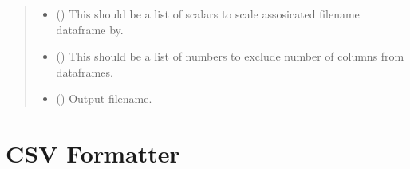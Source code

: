 \documentclass[letterpaper,10pt,english,openany,oneside]{sphinxmanual}
\begin{document}
\begin{fulllineitems}
\begin{quote}
\begin{description}
\begin{itemize}
\item {} 
 (\sphinxstyleliteralemphasis{\sphinxupquote{{[}}}\sphinxstyleliteralemphasis{\sphinxupquote{{]}}}\sphinxstyleliteralemphasis{\sphinxupquote{}}) \textendash{} This should be a list of scalars to scale assosicated filename dataframe by.

\item {} 
 (\sphinxstyleliteralemphasis{\sphinxupquote{{[}}}\sphinxstyleliteralemphasis{\sphinxupquote{{]}}}\sphinxstyleliteralemphasis{\sphinxupquote{}}) \textendash{} This should be a list of numbers to exclude number of columns from dataframes.

\item {} 
 () \textendash{} Output filename.

\end{itemize}

\end{description}\end{quote}

\end{fulllineitems}



\chapter{CSV Formatter}
\label{\detokenize{index:module-CSVFormatter}}\label{\detokenize{index:csv-formatter}}
\end{document}
